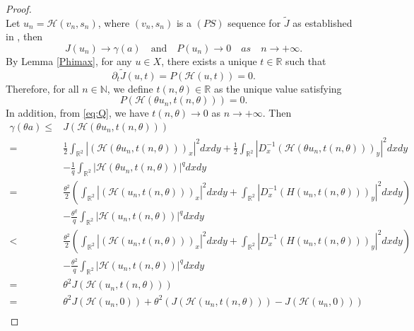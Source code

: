 \documentclass[11pt]{amsart}
\numberwithin{equation}{section}
\begin{document}
{{{\begin{proof}
$$    $$
    Let $u_n=\mathcal{H}(v_n,s_n)$,  where $(v_n,s_n)$ is a $(PS)$ sequence for $ \tilde{J} $ as established in \cite[Proposition 2.2]{Jean}, then
    \begin{equation}\label{eq:Q}
        J(u_n)\rightarrow \gamma(a)\quad \text{and}\quad P(u_n)\rightarrow 0 \quad as\quad n\rightarrow +\infty.
    \end{equation}
    By Lemma \ref{Phimax}, for any $u\in X$, {there exists a unique $t\in \mathbb{R} $ such that}
    $$
    {\partial_t}\tilde{J}(u,t)=P(\mathcal{H}(u, t))=0.
    $$
    Therefore, for all $n \in \mathbb{N}$, we define $t(n, \theta) \in \mathbb{R}$ as the unique value satisfying
    $$
    P(\mathcal{H}\left(\theta u_n, t(n, \theta)\right) )=0.
    $$
    In addition, from \eqref{eq:Q},  we have $t(n, \theta)\to 0$ as $n \rightarrow +\infty$.
    Then
    \begin{equation}
        \begin{aligned}
            \gamma(\theta a)  \leq& J\left(\mathcal{H}\left(\theta u_n, t(n, \theta)\right)\right) \\
            =&\frac{1}{2}\int_{\mathbb{R}^{2}} |(\mathcal{H}\left(\theta u_n, t(n, \theta)\right))_{x}|^{2} dx dy+\frac{1}{2}\int_{\mathbb{R}^{2}}|D^{-1}_{x} (\mathcal{H}\left(\theta u_n, t(n, \theta)\right))_{y}|^{2} dx dy\\
            &-\frac{1}{q}\int_{\mathbb{R}^2} |\mathcal{H}\left(\theta u_n, t(n, \theta)\right)|^qdxdy \\
            =&\frac{\theta^2}{2}\left(\int_{\mathbb{R}^{2}} |(\mathcal{H}\left( u_n, t(n, \theta)\right))_{x}|^{2} dx dy+\int_{\mathbb{R}^{2}}|D^{-1}_{x} (H\left( u_n, t(n, \theta)\right))_{y}|^{2} dx dy\right)\\
            &-\frac{\theta^q}{q}\int_{\mathbb{R}^2} |\mathcal{H}\left( u_n, t(n, \theta)\right)|^qdxdy \\
            <&\frac{\theta^2}{2}\left(\int_{\mathbb{R}^{2}} |(\mathcal{H}\left( u_n, t(n, \theta)\right))_{x}|^{2} dx dy+\int_{\mathbb{R}^{2}}|D^{-1}_{x} (H\left( u_n, t(n, \theta)\right))_{y}|^{2} dx dy\right)\\
            &-\frac{\theta^2}{q}\int_{\mathbb{R}^2} |\mathcal{H}\left( u_n, t(n, \theta)\right)|^q dxdy \\
            =&\theta^2 J\left(\mathcal{H}\left( u_n, t(n, \theta)\right)\right) \\
            =& \theta^2 J\left(\mathcal{H}\left( u_n, 0\right)\right)+\theta^2\left(J\left(\mathcal{H}\left( u_n, t(n, \theta)\right)\right)-J\left(\mathcal{H}\left( u_n, 0\right)\right)\right)  \\

\end{aligned}
\end{equation}
\end{proof}}}}
\end{document}
